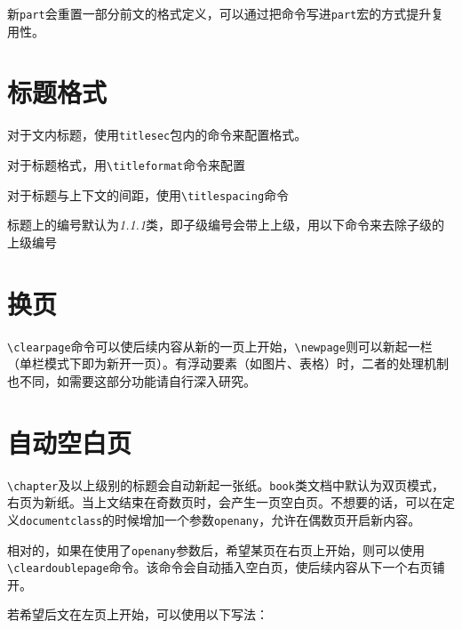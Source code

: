 \documentclass[10pt,openany]{book}
\begin{document}
新\texttt{part}会重置一部分前文的格式定义，可以通过把命令写进\texttt{part}宏的方式提升复用性。



\section{标题格式}

对于文内标题，使用\texttt{titlesec}包内的命令来配置格式。

对于标题格式，用\texttt{\textbackslash{}titleformat}命令来配置



对于标题与上下文的间距，使用\texttt{\textbackslash{}titlespacing}命令



标题上的编号默认为\textit{1.1.1}类，即子级编号会带上上级，用以下命令来去除子级的上级编号



\section{换页}

\texttt{\textbackslash{}clearpage}命令可以使后续内容从新的一页上开始，\texttt{\textbackslash{}newpage}则可以新起一栏（单栏模式下即为新开一页）。有浮动要素（如图片、表格）时，二者的处理机制也不同，如需要这部分功能请自行深入研究。

\section{自动空白页}

\texttt{\textbackslash{}chapter}及以上级别的标题会自动新起一张纸。\texttt{book}类文档中默认为双页模式，右页为新纸。当上文结束在奇数页时，会产生一页空白页。不想要的话，可以在定义\texttt{documentclass}的时候增加一个参数\texttt{openany}，允许在偶数页开启新内容。



相对的，如果在使用了\texttt{openany}参数后，希望某页在右页上开始，则可以使用\texttt{\textbackslash{}cleardoublepage}命令。该命令会自动插入空白页，使后续内容从下一个右页铺开。

若希望后文在左页上开始，可以使用以下写法：
\end{document}
